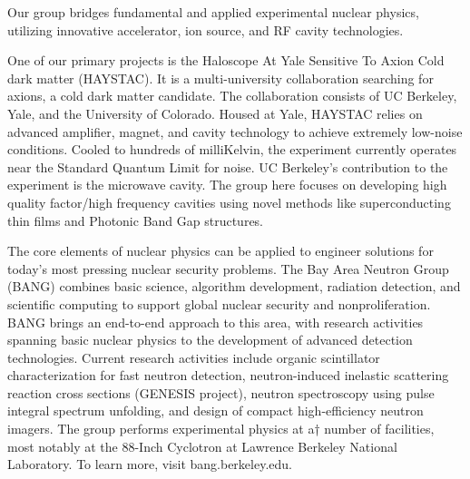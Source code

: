 
Our group bridges fundamental and applied experimental nuclear physics, utilizing innovative accelerator, ion source, and RF cavity technologies.

One of our primary projects is the Haloscope At Yale Sensitive To Axion Cold dark matter (HAYSTAC). It is a multi-university collaboration searching for axions, a cold dark matter candidate. 
The collaboration consists of UC Berkeley, Yale, and the University of Colorado. 
Housed at Yale, HAYSTAC relies on advanced amplifier, magnet, and cavity technology to achieve extremely low-noise conditions. 
Cooled to hundreds of milliKelvin, the experiment currently operates near the Standard Quantum Limit for noise. 
UC Berkeley’s contribution to the experiment is the microwave cavity. 
The group here focuses on developing high quality factor/high frequency cavities using novel methods like superconducting thin films and Photonic Band Gap structures.




The core elements of nuclear physics can be applied to engineer solutions for today’s most pressing nuclear security problems. 
The Bay Area Neutron Group (BANG) combines basic science, algorithm development, radiation detection, and scientific computing to support global nuclear security and nonproliferation. 
BANG brings an end-to-end approach to this area, with research activities spanning basic nuclear physics to the development of advanced detection technologies. 
Current research activities include organic scintillator characterization for fast neutron detection, neutron-induced inelastic scattering reaction cross sections (GENESIS project), neutron spectroscopy using pulse integral spectrum unfolding, and design of compact high-efficiency neutron imagers. 
The group performs experimental physics at a† number of facilities, most notably at the 88-Inch Cyclotron at Lawrence Berkeley National Laboratory. 
To learn more, visit bang.berkeley.edu.

